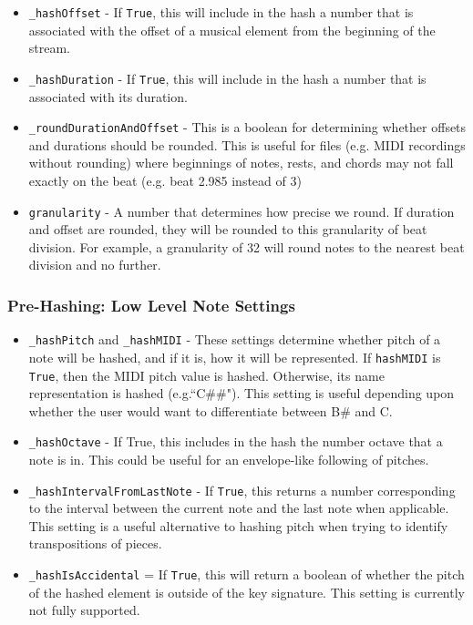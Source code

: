                     \begin{itemize}
                    \item \texttt{\_hashOffset} - If \texttt{True}, this will include in the hash a number that is associated with the offset of a musical element from the beginning of the stream. 
                    \item \texttt{\_hashDuration} - If \texttt{True}, this will include in the hash a number that is associated with its duration.
                    \item \texttt{\_roundDurationAndOffset} - This is a boolean for determining whether offsets and durations should be rounded. This is useful for files (e.g. MIDI recordings without rounding) where beginnings of notes, rests, and chords may not fall exactly on the beat (e.g. beat 2.985 instead of 3)
                    \item \texttt{granularity} - A number that determines how precise we round. If duration and offset are rounded, they will be rounded to this granularity of beat division. For example, a granularity of 32 will round notes to the nearest  beat division and no further.
                    \end{itemize}
        
        \subsubsection{Pre-Hashing: Low Level Note Settings}
                    \begin{itemize}
                    \item \texttt{\_hashPitch} and \texttt{\_hashMIDI} - These settings determine whether pitch of a note will be hashed, and if it is, how it will be represented. If \texttt{hashMIDI} is \texttt{True}, then the MIDI pitch value is hashed. Otherwise, its name representation is hashed (e.g.``C\#\#"). This setting is useful depending upon whether the user would want to differentiate between B\# and C.
                    \item \texttt{\_hashOctave} - If True, this includes in the hash the number octave that a note is in. This could be useful for an envelope-like following of pitches. 
                    \item \texttt{\_hashIntervalFromLastNote} - If \texttt{True}, this returns a number corresponding to the interval between the current note and the last note when applicable. This setting is a useful alternative to hashing pitch when trying to identify transpositions of pieces.
                    \item \texttt{\_hashIsAccidental} = If \texttt{True}, this will return a boolean of whether the pitch of the hashed element is outside of the key signature. This setting is currently not fully supported. 
                    \end{itemize}
